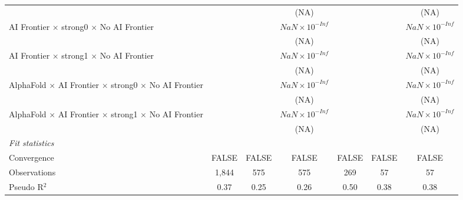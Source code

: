 \begin{tabular}{lcccccc}
                                                                              &                        &                        & (NA)                   &         &                        & (NA)\\   
   AI Frontier $\times$ strong0 $\times$ No AI Frontier                       &                        &                        & $NaN\times 10^{-Inf}$  &         &                        & $NaN\times 10^{-Inf}$\\    
                                                                              &                        &                        & (NA)                   &         &                        & (NA)\\   
   AI Frontier $\times$ strong1 $\times$ No AI Frontier                       &                        &                        & $NaN\times 10^{-Inf}$  &         &                        & $NaN\times 10^{-Inf}$\\    
                                                                              &                        &                        & (NA)                   &         &                        & (NA)\\   
   AlphaFold $\times$ AI Frontier $\times$ strong0 $\times$ No AI Frontier    &                        &                        & $NaN\times 10^{-Inf}$  &         &                        & $NaN\times 10^{-Inf}$\\    
                                                                              &                        &                        & (NA)                   &         &                        & (NA)\\   
   AlphaFold $\times$ AI Frontier $\times$ strong1 $\times$ No AI Frontier    &                        &                        & $NaN\times 10^{-Inf}$  &         &                        & $NaN\times 10^{-Inf}$\\    
                                                                              &                        &                        & (NA)                   &         &                        & (NA)\\   
   \midrule
   \emph{Fit statistics}\\
   Convergence                                                                &FALSE                   & FALSE                  & FALSE                  & FALSE   & FALSE                  & FALSE\\  
   Observations                                                               & 1,844                  & 575                    & 575                    & 269     & 57                     & 57\\  
   Pseudo R$^2$                                                               & 0.37                   & 0.25                   & 0.26                   & 0.50    & 0.38                   & 0.38\\  
   

\end{tabular}
